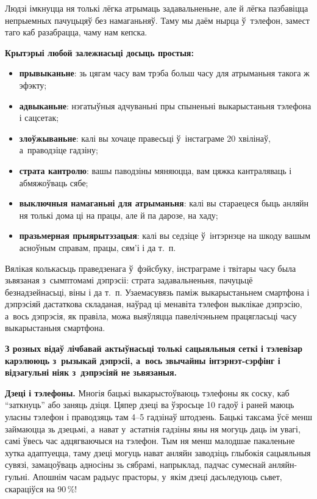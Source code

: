 Людзі імкнуцца ня толькі лёгка атрымаць задавальненьне, але й лёгка пазбавіцца непрыемных пачуцьцяў без намаганьняў. Таму мы даём нырца ў~тэлефон, замест таго каб разабрацца, чаму нам кепска.

\textbf{Крытэрыі любой залежнасьці досыць простыя:} 
\begin{itemize}
  \item \textbf{прывыканьне}: зь цягам часу вам трэба больш часу для атрыманьня такога ж эфэкту;
  \item \textbf{адвыканьне}: нэгатыўныя адчуваньні пры спыненьні выкарыстаньня тэлефона і сацсетак;
  \item \textbf{злоўжываньне}: калі вы хочаце правесьці ў~інстаграме 20 хвілінаў, а~праводзіце гадзіну;
  \item \textbf{страта кантролю}: вашы паводзіны мяняюцца, вам цяжка кантраляваць і абмяжоўваць сябе;
  \item \textbf{выключныя намаганьні для атрыманьня}: калі вы стараецеся быць анляйн ня толькі дома ці на працы, але й па дарозе, на хаду;
  \item \textbf{празьмерная прыярытэзацыя}: калі вы седзіце ў~інтэрнэце на шкоду вашым асноўным справам, працы, сям'і і да т.~п.
\end{itemize}

Вялікая колькасьць праведзенага ў~фэйсбуку, інстраграме і твітары часу была зьвязаная з~сымптомамі дэпрэсіі: страта задавальненьня, пачуцьцё безнадзейнасьці, віны і да т.~п. Узаемасувязь паміж выкарыстаньнем смартфона і дэпрэсіяй дастаткова складаная, наўрад ці менавіта тэлефон выклікае дэпрэсію, а~вось дэпрэсія, як правіла, можа выяўляцца павелічэньнем працягласьці часу выкарыстаньня смартфона.

\textbf{З розных відаў лічбавай актыўнасьці толькі сацыяльныя сеткі і тэлевізар карэлююць з~рызыкай дэпрэсіі, а~вось звычайны інтэрнэт-сэрфінг і відэагульні ніяк з~дэпрэсіяй не зьвязаныя.}

\textbf{Дзеці і тэлефоны.} Многія бацькі выкарыстоўваюць тэлефоны як соску, каб ``заткнуць'' або заняць дзіця. Цяпер дзеці ва ўзросьце 10 гадоў і раней маюць уласны тэлефон і праводзяць там 4--5 гадзінаў штодзень. Бацькі таксама ўсё менш займаюцца зь дзецьмі, а~нават у~астатнія гадзіны яны ня могуць даць ім увагі, самі ўвесь час адцягваючыся на тэлефон. Тым ня менш малодшае пакаленьне хутка адаптуецца, таму дзеці могуць нават анляйн заводзіць глыбокія сацыяльныя сувязі, замацоўваць адносіны зь сябрамі, напрыклад, падчас сумеснай анляйн-гульні. Апошнім часам радыус прасторы, у~якім дзеці дасьледуюць сьвет, скараціўся на 90\,\%!

